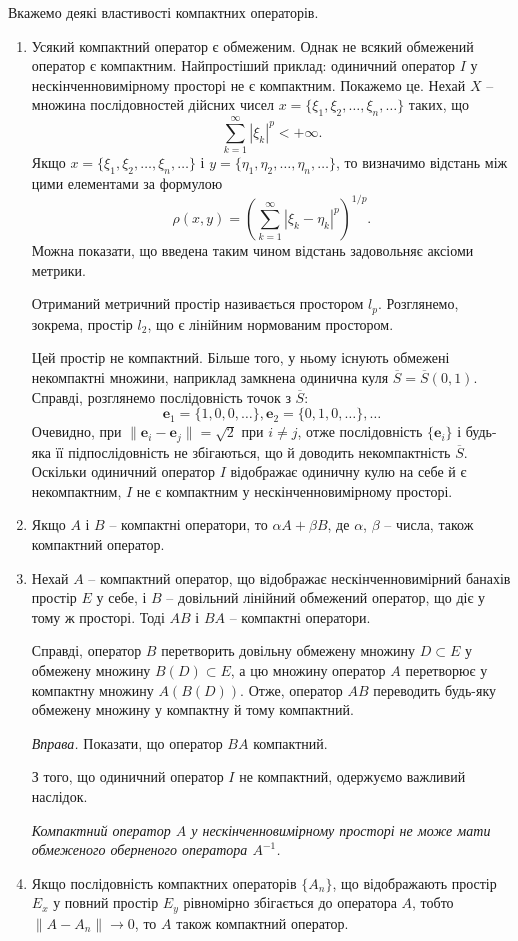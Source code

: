 \documentclass[14pt,twoside]{extreport}
\theoremstyle{mystyle}
\numberwithin{equation}{chapter}
\begin{document}
Вкажемо деякі властивості компактних операторів.
\begin{enumerate}
	\item Усякий компактний оператор є обмеженим. Однак не всякий обмежений оператор є компактним. Найпростіший приклад: одиничний оператор $I$ у нескінченновимірному просторі не є компактним. Покажемо це. Нехай $X$ -- множина послідовностей дійсних чисел $x=\{\xi_1, \xi_2, \ldots, \xi_n, \ldots\}$ таких, що
\[
 \sum_{k=1}^{\infty} |\xi_k|^p < +\infty.
\]
	Якщо $x=\{\xi_1, \xi_2, \ldots, \xi_n, \ldots\}$ і $y=\{\eta_1, \eta_2, \ldots, \eta_n, \ldots\}$, то визначимо відстань між цими елементами за формулою
\[
 \rho(x, y) =\left(\sum_{k=1}^{\infty}|\xi_k-\eta_k|^p\right)^{1/p}.
\]
	Можна показати, що введена таким чином відстань задовольняє аксіоми метрики.
	
	Отриманий метричний простір називається простором $l_p$. Розглянемо, зокрема, простір $l_2$, що є лінійним нормованим простором.
	
	Цей простір не компактний. Більше того, у ньому існують обмежені некомпактні множини, наприклад замкнена одинична куля $\overline{S} = \overline{S}(0, 1)$. Справді, розглянемо послідовність точок з $\overline{S}$:
\[
 \mathbf{e}_1=\{1, 0, 0, \ldots\}, \mathbf{e}_2=\{0, 1, 0, \ldots\}, \ldots
\]
	Очевидно,  при $\|\mathbf{e}_i-\mathbf{e}_j\|=\sqrt{2}$ при $i \neq j$, отже послідовність $\{\mathbf{e}_i\}$ і будь-яка її підпослідовність не збігаються, що й доводить некомпактність $\overline{S}$. Оскільки одиничний оператор $I$ відображає одиничну кулю на себе й є некомпактним, $I$ не є компактним у нескінченновимірному просторі.
	\item Якщо $A$ і $B$ -- компактні оператори, то $\alpha A + \beta B$, де $\alpha$, $\beta$ -- числа, також компактний оператор.
	\item Нехай $A$ -- компактний оператор, що відображає нескінченновимірний банахів простір $E$ у себе, і $B$ -- довільний лінійний обмежений оператор, що діє у тому ж просторі. Тоді $AB$ і $BA$ -- компактні оператори.

	Справді, оператор $B$ перетворить довільну обмежену множину $D \subset E$ у обмежену множину $B(D) \subset E$, а цю множину оператор $A$ перетворює у компактну множину $A(B(D))$. Отже, оператор $AB$ переводить будь-яку обмежену множину у компактну й тому компактний.

\begin{small}
 \emph{Вправа.} Показати, що оператор $BA$ компактний.
\end{small}

З того, що одиничний оператор $I$ не компактний, одержуємо важливий наслідок.

\emph{Компактний оператор $A$ у нескінченновимірному просторі не може мати обмеженого оберненого оператора $A^{-1}$.}
\item  Якщо послідовність компактних операторів $\{A_n\}$, що відображають простір $E_x$ у повний простір $E_y$ рівномірно збігається до оператора $A$, тобто $\|A - A_n\| \to 0$, то $A$ також компактний оператор.
\end{enumerate}
\end{document}
